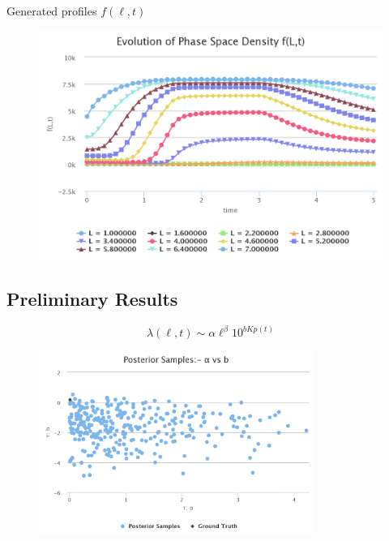 \documentclass{beamer}
\begin{document}
\begin{frame}{Generated profiles $f(\ell, t)$}
  \begin{figure}[h]
  \includegraphics[width=\textwidth]{psdt_ex1.png}
\end{figure}
\end{frame}


\subsection{Preliminary Results}

\begin{frame}
  \begin{equation*}
    \lambda(\ell, t) \sim \alpha \ell^{\beta} 10^{b Kp(t)}
  \end{equation*}
  \begin{figure}[h]
  \includegraphics[width=0.8\textwidth]{samples1_ex1.png}
  \label{fig:Samples1Ex1}
\end{figure}
\end{frame}
\end{document}
